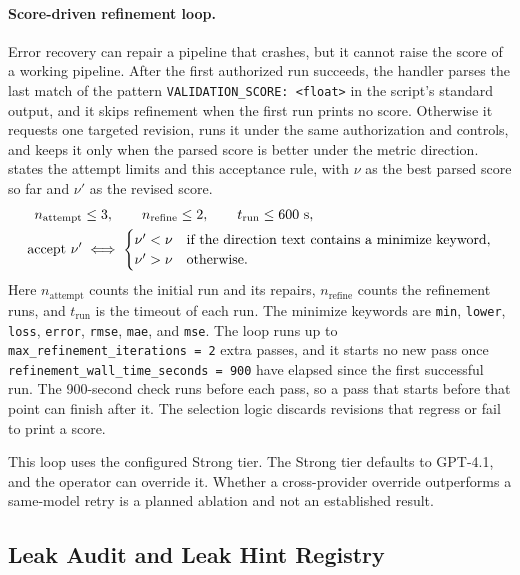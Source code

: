 \documentclass{article}
\begin{document}
\paragraph{Score-driven refinement loop.}
Error recovery can repair a pipeline that crashes, but it cannot raise the score of a working pipeline. After the first authorized run succeeds, the handler parses the last match of the pattern \texttt{VALIDATION\_SCORE: <float>} in the script's standard output, and it skips refinement when the first run prints no score. Otherwise it requests one targeted revision, runs it under the same authorization and controls, and keeps it only when the parsed score is better under the metric direction.  states the attempt limits and this acceptance rule, with $\nu$ as the best parsed score so far and $\nu'$ as the revised score.
\begin{align}
  n_{\text{attempt}} &\le 3, \qquad n_{\text{refine}} \le 2, \qquad t_{\text{run}} \le 600\ \text{s}, \notag\\
  \text{accept } \nu' &\iff
  \begin{cases}
    \nu' < \nu & \text{if the direction text contains a minimize keyword},\\
    \nu' > \nu & \text{otherwise.}
  \end{cases} \label{eq:mle}
\end{align}
Here $n_{\text{attempt}}$ counts the initial run and its repairs, $n_{\text{refine}}$ counts the refinement runs, and $t_{\text{run}}$ is the timeout of each run. The minimize keywords are \texttt{min}, \texttt{lower}, \texttt{loss}, \texttt{error}, \texttt{rmse}, \texttt{mae}, and \texttt{mse}. The loop runs up to \texttt{max\_refinement\_iterations\,=\,2} extra passes, and it starts no new pass once \texttt{refinement\_wall\_time\_seconds\,=\,900} have elapsed since the first successful run. The 900-second check runs before each pass, so a pass that starts before that point can finish after it. The selection logic discards revisions that regress or fail to print a score.

This loop uses the configured Strong tier. The Strong tier defaults to GPT-4.1, and the operator can override it. Whether a cross-provider override outperforms a same-model retry is a planned ablation and not an established result.

\subsection{Leak Audit and Leak Hint Registry}
\end{document}
